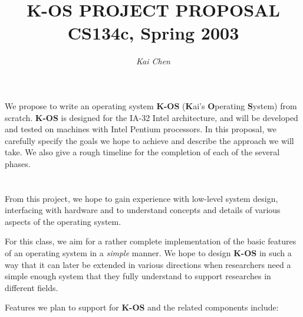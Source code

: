 \documentclass[dvips,11pt]{article}
\begin{document}
\title{\large{\bf{K-OS PROJECT PROPOSAL}}
\\
\normalsize{\bf{CS134c, Spring 2003}}}

\author{\it{\small{Kai Chen}}}

\date{}


\maketitle


\section{\textbf{}}
We propose to write an operating system {\bf K-OS} ({\bf K}ai's {\bf
O}perating {\bf S}ystem) from scratch. {\bf K-OS} is designed for the
IA-32 Intel architecture, and will be developed and tested on
machines with Intel Pentium processors. In this proposal, we carefully
specify the goals we hope to achieve and describe the approach we
will take. We also give a rough timeline for the completion of each of
the several phases.


\section{\textbf{}}
From this project, we hope to gain experience with low-level
system design, interfacing with hardware and to understand concepts
and details of various aspects of the operating system. 

For this class, we aim for a rather complete implementation of the basic
features of an operating system in a {\it simple} manner. We hope to
design {\bf K-OS} in such a way that it can later be extended in
various directions when researchers need a simple enough system that
they fully understand to support researches in different fields.

Features we plan to support for {\bf K-OS} and the related components 
include:
\end{document}
